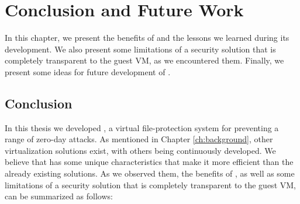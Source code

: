 
\chapter{Conclusion and Future Work}\label{ch:chapter5}

\par In this chapter, we present the benefits of  and the lessons we learned during its development. We also present some limitations of a security solution that is completely transparent to the guest \ac{VM}, as we encountered them. Finally, we present some ideas for future development of .

\section{Conclusion}

\par In this thesis we developed , a virtual file-protection system for preventing a range of zero-day attacks. As mentioned in Chapter \ref{ch:background}, other virtualization solutions exist, with others being continuously developed. We believe that  has some unique characteristics that make it more efficient than the already existing solutions. As we observed them, the benefits of , as well as some limitations of a security solution that is completely transparent to the guest \ac{VM}, can be summarized as follows:

